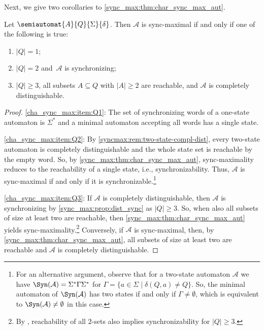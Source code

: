 Next, we give two corollaries to \cref{sync_max:thm:char_sync_max_aut}.

\begin{corollary}	\label{sync_max:cor:char_sync_max_aut}
	Let $\semiautomat{A}{Q}{\Sigma}{\delta}$.
	Then $\mathcal A$ is sync-maximal
	if and only if one of the following is true:
	\begin{enumerate}
		\item \label{cha_sync_max:item:Q1} $|Q| = 1$;
		\item \label{cha_sync_max:item:Q2} $|Q| = 2$ and~$\mathcal A$ is synchronizing;
		\item \label{cha_sync_max:item:Q3} $|Q| \ge 3$,  all subsets $A \subseteq Q$
		with $|A| \ge 2$ are reachable, and $\mathcal A$ is completely distinguishable.
	\end{enumerate}
\end{corollary}
\begin{proof}
	\ref{cha_sync_max:item:Q1}: The set of synchronizing words of a one-state automaton is $\Sigma^*$
	and a minimal automaton accepting all words has a single state.
	
	\ref{cha_sync_max:item:Q2}: By \cref{syncmax:rem:two-state-compl-dist}, every two-state automaton is completely distinguishable
	and the whole state set is reachable by the empty word.
	So, by \cref{sync_max:thm:char_sync_max_aut},
	sync-maximality reduces to the reachability of a single state, i.e., synchronizability.
	Thus, $\mathcal A$ is sync-maximal if and only if it is synchronizable.\footnote{For an alternative
		argument, observe that for a two-state automaton $\mathcal A$
		we have $\Syn(\mathcal A) = \Sigma^* \Gamma \Sigma^*$
		for $\Gamma = \{a\in \Sigma \mid \delta(Q, a) \ne Q \}$.
		So, the minimal automaton of $\Syn(\mathcal A)$ 
		has two states if and only if $\Gamma \ne \emptyset$,
		which is equivalent to $\Syn(\mathcal A) \ne \emptyset$ in this case.}
	
	\ref{cha_sync_max:item:Q3}:
	If $\mathcal A$
	is completely distinguishable, then $\mathcal A$
	is synchronizing  by \cref{sync_max:prop:dist_sync} as $|Q| \ge 3$.
	So, when also all subsets of size at least two
	are reachable, then \cref{sync_max:thm:char_sync_max_aut} 
	yields sync-maximality.\footnote{By , reachability of all $2$-sets also implies
		synchronizability for $|Q| \ge 3$.}
	Conversely, if $\mathcal A$
	is sync-maximal, then, by \cref{sync_max:thm:char_sync_max_aut},
	all subsets of size at least two are reachable
	and $\mathcal A$ is completely distinguishable.
\end{proof}

